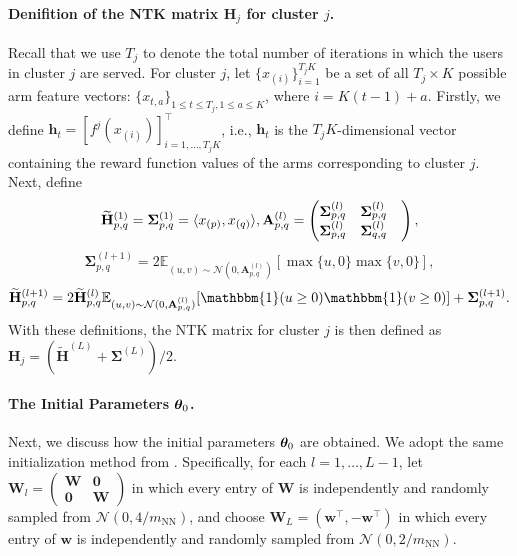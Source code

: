 \paragraph{Denifition of the NTK matrix $\mathbf{H}_j$ for cluster $j$.}
Recall that we use $T_j$ to denote the total number of iterations in which the users in cluster $j$ are served.
For cluster $j$, let $\{x_{(i)}\}_{i=1}^{T_j K}$ be a set of all $T_j \times K$ possible arm feature vectors: $\{x_{t,a}\}_{1\le t \le T_j, 1\le a \le K}$, where $i = K(t-1) + a$. 
Firstly, we define $\mathbf{h}_t = [f^j(x_{(i)})]_{i=1,\ldots,T_j K}^{\top}$, i.e., $\mathbf{h}_t$ is the $T_j K$-dimensional vector containing the reward function values of the arms corresponding to cluster $j$.
Next, define 
$$
\widetilde{\mathbf{H}}_{p,q}^{(1)} = \mathbf{\Sigma}_{p,q}^{(1)} = \langle x_{(p)}, x_{(q)}  \rangle, \\
\mathbf{A}_{p,q}^{(l)} =\begin{pmatrix}
	\mathbf{\Sigma}_{p,q}^{(l)} & \mathbf{\Sigma}_{p,q}^{(l)} &\\
	\mathbf{\Sigma}_{p,q}^{(l)} &\mathbf{\Sigma}_{q,q}^{(l)} &
\end{pmatrix},
$$
$$
\mathbf{\Sigma}_{p,q}^{(l+1)} = 2\mathbb{E}_{(u,v)\sim\mathcal{N}(0,\mathbf{A}_{p,q}^{(l)} )}[\max\{u,0\}\max\{v,0\}],
$$
$$
\widetilde{\mathbf{H}}_{p,q}^{(l+1)} = 2\widetilde{\mathbf{H}}_{p,q}^{(l)}\mathbb{E}_{(u,v)\sim\mathcal{N}(0,\mathbf{A}_{p,q}^{(l)} )}[\mathbbm{1}(u \ge 0)\mathbbm{1}(v \ge 0)] + \mathbf{\Sigma}_{p,q}^{(l+1)}.
$$
With these definitions, the NTK matrix for cluster $j$ is then defined as $\mathbf{H}_j = (\widetilde{\mathbf{H}}^{(L)} + \mathbf{\Sigma}^{(L)})/2$.

\paragraph{The Initial Parameters $\boldsymbol{\theta}_0$.}
Next, we discuss how the initial parameters $\boldsymbol{\theta}_0$ are obtained.
We adopt the same initialization method from \citet{zhang2020neural,zhou2020neural}.
Specifically, for each $l=1,\ldots,L-1$, let 
$\mathbf{W}_l=\left(
\begin{array}{cc} 
  \mathbf{W} & \mathbf{0} \\ 
  \mathbf{0} & \mathbf{W} 
\end{array} 
\right)$
in which every entry of $\mathbf{W}$ is independently and randomly sampled from $\mathcal{N}(0, 4/m_{\text{NN}})$, and choose $\mathbf{W}_L=(\mathbf{w}^{\top},-\mathbf{w}^{\top})$ in which every entry of $\mathbf{w}$ is independently and randomly sampled from $\mathcal{N}(0,2/m_{\text{NN}})$.

